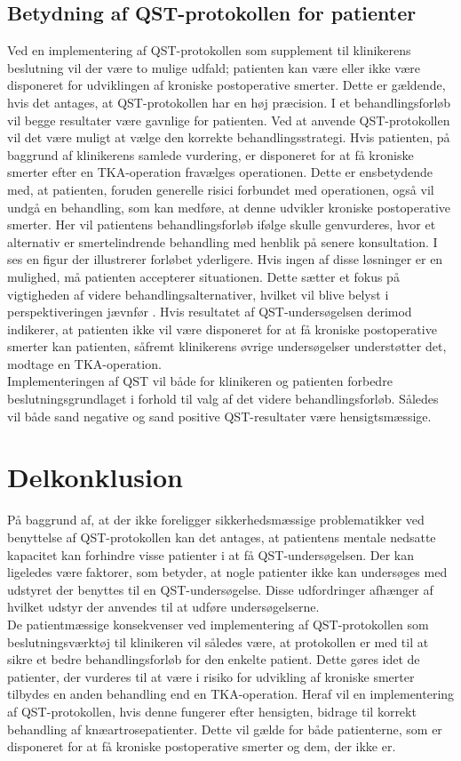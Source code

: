 \subsection{Betydning af QST-protokollen for patienter}
Ved en implementering af QST-protokollen som supplement til klinikerens beslutning vil der være to mulige udfald; patienten kan være eller ikke være disponeret for udviklingen af kroniske postoperative smerter. Dette er gældende, hvis det antages, at QST-protokollen har en høj præcision. I et behandlingsforløb vil begge resultater være gavnlige for patienten. Ved at anvende QST-protokollen vil det være muligt at vælge den korrekte behandlingsstrategi. Hvis patienten, på baggrund af klinikerens samlede vurdering, er disponeret for at få kroniske smerter efter en TKA-operation fravælges operationen. Dette er ensbetydende med, at patienten, foruden generelle risici forbundet med operationen, også vil undgå en behandling, som kan medføre, at denne udvikler kroniske postoperative smerter. Her vil patientens behandlingsforløb ifølge  skulle genvurderes, hvor et alternativ er smertelindrende behandling med henblik på senere konsultation. I  ses en figur der illustrerer forløbet yderligere. Hvis ingen af disse løsninger er en mulighed, må patienten accepterer situationen. Dette sætter et fokus på vigtigheden af videre behandlingsalternativer, hvilket vil blive belyst i perspektiveringen jævnfør . Hvis resultatet af QST-undersøgelsen derimod indikerer, at patienten ikke vil være disponeret for at få kroniske postoperative smerter kan patienten, såfremt klinikerens øvrige undersøgelser understøtter det, modtage en TKA-operation. \\
Implementeringen af QST vil både for klinikeren og patienten forbedre beslutningsgrundlaget i forhold til valg af det videre behandlingsforløb. Således vil både sand negative og sand positive QST-resultater være hensigtsmæssige.


\section{Delkonklusion}
På baggrund af, at der ikke foreligger sikkerhedsmæssige problematikker ved benyttelse af QST-protokollen kan det antages, at patientens mentale nedsatte kapacitet kan forhindre visse patienter i at få QST-undersøgelsen. Der kan ligeledes være faktorer, som betyder, at nogle patienter ikke kan undersøges med udstyret der benyttes til en QST-undersøgelse. Disse udfordringer afhænger af hvilket udstyr der anvendes til at udføre undersøgelserne.\\
De patientmæssige konsekvenser ved implementering af QST-protokollen som beslutningsværktøj til klinikeren vil således være, at protokollen er med til at sikre et bedre behandlingsforløb for den enkelte patient. Dette gøres idet de patienter, der vurderes til at være i risiko for udvikling af kroniske smerter tilbydes en anden behandling end en TKA-operation. Heraf vil en implementering af QST-protokollen, hvis denne fungerer efter hensigten, bidrage til korrekt behandling af knæartrosepatienter. Dette vil gælde for både patienterne, som er disponeret for at få kroniske postoperative smerter og dem, der ikke er.


